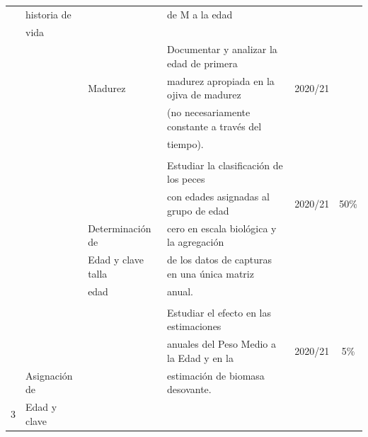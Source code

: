 \documentclass[
  spanish,
]{article}
\begin{document}
\begin{table}[h]
{\begin{tabular}{|c|l|l|l|c|c|}
     & historia de   &                      & de M a la edad                                  &              & \\
     & vida          &                      &                                                 &              & \\
     &               &                      & Documentar y analizar la edad de primera        &              & \\
     &               & Madurez              & madurez apropiada en la ojiva de madurez        &  2020/21     & \\
     &               &                      & (no necesariamente constante a través del       &              & \\
     &               &                      & tiempo).                                        &              & \\ \hline
     &               &                      &                                                 &              & \\
     &               &                      & Estudiar la clasificación de los peces          &              & \\
     &               &                      & con edades asignadas al grupo de edad           &  2020/21     & 50\%\\
     &               & Determinación de     & cero en escala biológica y la agregación        &              & \\
     &               & Edad y clave talla   & de los datos de capturas en una única matriz    &              & \\
     &               & edad                 & anual.                                          &              & \\
     &               &                      &                                                 &              & \\
     &               &                      & Estudiar el efecto en las estimaciones          &              & \\
     &               &                      & anuales del Peso Medio a la Edad y en la        &  2020/21     & 5\%\\
     & Asignación de &                      & estimación de biomasa desovante.                &              & \\
   3 & Edad y clave  &                      &                                                 &              & \\

\end{tabular}}
\end{table}
\end{document}
